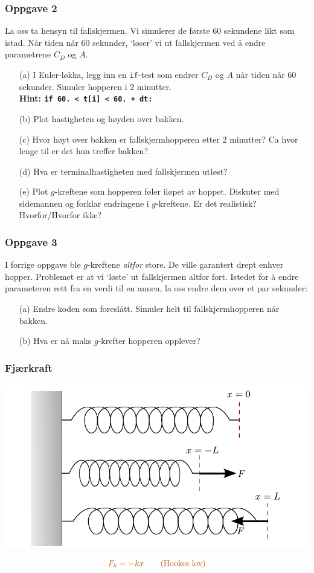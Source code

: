 \documentclass[english, 12pt]{beamer}
\newcommand{\alrt}{\color{AlertColor}}
\begin{document}
\begin{frame}
\frametitle{Oppgave 2}

La oss ta hensyn til fallskjermen. Vi simulerer de første 60 sekundene likt som istad. Når tiden når 60 sekunder, `løser' vi ut fallskjermen ved å endre parametrene $C_D$ og $A$.

\begin{itemize}
    \item[(a)] I Euler-løkka, legg inn en \texttt{\alrt if}-test som endrer $C_D$ og $A$ når tiden når 60 sekunder. Simuler hopperen i 2 minutter.\\  \textbf{Hint: \texttt{\alrt if 60.\ < t[i] < 60.\ + dt:}}
	\item[(b)] Plot hastigheten og høyden over bakken.
	\item[(c)] Hvor høyt over bakken er fallskjermhopperen etter 2 minutter? Ca hvor lenge til er det hun treffer bakken?
	\item[(d)] Hva er terminalhastigheten med fallskjermen utløst?
	\item[(e)] Plot $g$-kreftene som hopperen føler iløpet av hoppet. Diskuter med sidemannen og forklar endringene i $g$-kreftene. Er det realistisk? Hvorfor/Hvorfor ikke?
\end{itemize}
\end{frame}

\begin{frame}
\frametitle{Oppgave 3}

I forrige oppgave ble $g$-kreftene \emph{altfor} store. De ville garantert drept enhver hopper. Problemet er at vi `løste' ut fallskjermen altfor fort. Istedet for å endre parameteren rett fra en verdi til en annen, la oss endre dem over et par sekunder:


\begin{itemize}
	\item[(a)] Endre koden som foreslått. Simuler helt til fallskjermhopperen når bakken.
	\item[(b)] Hva er nå maks $g$-krefter hopperen opplever?
\end{itemize}
\end{frame}

\begin{frame}
\frametitle{Fjærkraft}
\begin{center}
	\includegraphics[width=\textwidth]{spring.pdf}
\end{center}

$$\alrt F_k = -kx \qquad \mbox{(Hookes lov)}$$ 
\end{frame}
\end{document}
